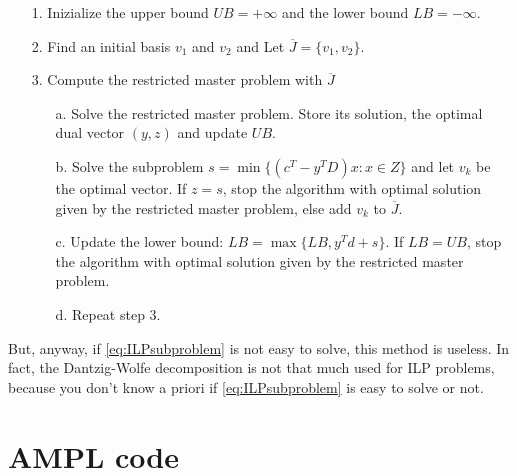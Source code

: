 \documentclass[a4paper,12pt]{article}
\begin{document}
\begin{itemize}
\item[1.] Inizialize the upper bound $UB = +\infty$ and the lower bound $LB = -\infty$.
\item[2.] Find an initial basis $v_1$ and $v_2$ and Let $\overline{J} = \{v_1,v_2\}$.
\item[3.] Compute the restricted master problem with $\overline{J}$
\begin{itemize}
\item[a.] Solve the restricted master problem. Store its solution, the optimal dual vector $(y,z)$ and update $UB$.
\item[b.] Solve the subproblem $s = \min\{(c^T - y^TD)x : x \in Z \}$ and let $v_k$ be the optimal vector. If $z = s$, stop the algorithm with optimal solution given by the restricted master problem, else add $v_k$ to $\overline{J}$.
\item[c.] Update the lower bound: $LB  = \max\{LB,y^T d + s\}$. If $LB = UB$, stop the algorithm with optimal solution given by the restricted master problem.
\item[d.] Repeat step 3.
\end{itemize}
\end{itemize}

But, anyway, if \eqref{eq:ILPsubproblem} is not easy to solve, this method is useless. In fact, the Dantzig-Wolfe decomposition is not that much used for ILP problems, because you don't know a priori if \eqref{eq:ILPsubproblem} is easy to solve or not.

\newpage

\section{AMPL code}
\end{document}
